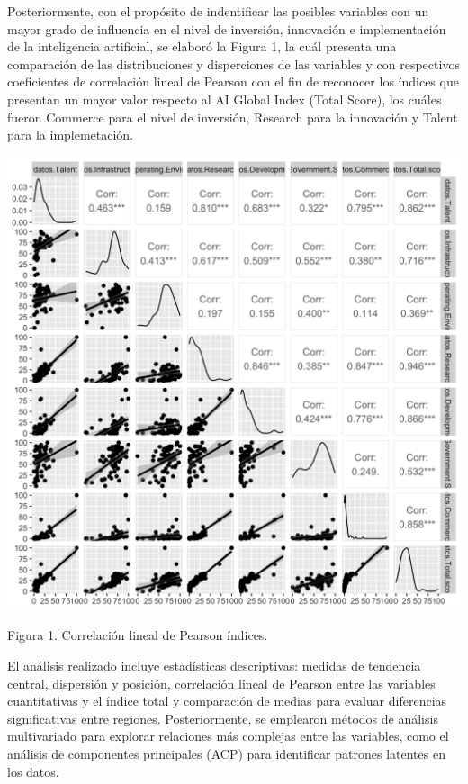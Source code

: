 \documentclass[
]{article}
\begin{document}
\begin{multicols}{2}


Posteriormente, con el propósito de indentificar las posibles variables con un mayor grado de influencia en el nivel de inversión, innovación e implementación de la inteligencia artificial, se elaboró la Figura 1, la cuál presenta una comparación de las distribuciones y disperciones de las variables y con respectivos coeficientes de correlación lineal de Pearson con el fin de reconocer los índices que presentan un mayor valor respecto al AI Global Index (Total Score), los cuáles fueron Commerce para el nivel de inversión, Research para la innovación y Talent para la implemetación. 




\begin{center}
\includegraphics[width=\linewidth]{figura1.png}
\end{center}
Figura 1. Correlación lineal de Pearson índices.

El análisis realizado incluye estadísticas descriptivas: medidas de tendencia central, dispersión y posición, correlación lineal de Pearson entre las variables cuantitativas y el índice total y comparación de medias para evaluar diferencias significativas entre regiones. Posteriormente, se emplearon métodos de análisis multivariado para explorar relaciones más complejas entre las variables, como el análisis de componentes principales (ACP) para identificar patrones latentes en los datos.


\end{multicols}
\end{document}
